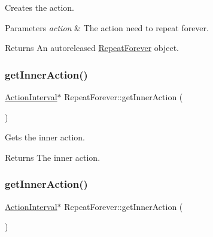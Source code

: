 Creates the action.


\begin{DoxyParams}{Parameters}
{\em action} & The action need to repeat forever. \\
\hline
\end{DoxyParams}
\begin{DoxyReturn}{Returns}
An autoreleased \hyperlink{classRepeatForever}{Repeat\+Forever} object. 
\end{DoxyReturn}
\mbox{\label{classRepeatForever_a778110910237e34b6197c9921c3fe1bb}} 
\subsubsection{\texorpdfstring{get\+Inner\+Action()}{getInnerAction()}\hspace{0.1cm}{\footnotesize\ttfamily [1/2]}}
{\footnotesize\ttfamily \hyperlink{classActionInterval}{Action\+Interval}$\ast$ Repeat\+Forever\+::get\+Inner\+Action (\begin{DoxyParamCaption}{ }\end{DoxyParamCaption})\hspace{0.3cm}{\ttfamily [inline]}}

Gets the inner action.

\begin{DoxyReturn}{Returns}
The inner action. 
\end{DoxyReturn}
\mbox{\label{classRepeatForever_a778110910237e34b6197c9921c3fe1bb}} 
\subsubsection{\texorpdfstring{get\+Inner\+Action()}{getInnerAction()}\hspace{0.1cm}{\footnotesize\ttfamily [2/2]}}
{\footnotesize\ttfamily \hyperlink{classActionInterval}{Action\+Interval}$\ast$ Repeat\+Forever\+::get\+Inner\+Action (\begin{DoxyParamCaption}{ }\end{DoxyParamCaption})\hspace{0.3cm}{\ttfamily [inline]}}

